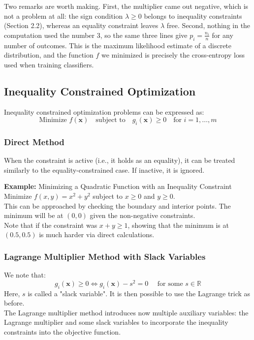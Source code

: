 \documentclass[]{article}
\newcommand{\R}{\mathbb{R}}
\begin{document}
	Two remarks are worth making.
	First, the multiplier came out negative, which is not a problem at all: the sign condition $\lambda \geq 0$ belongs to inequality constraints (Section 2.2), whereas an equality constraint leaves $\lambda$ free.
	Second, nothing in the computation used the number $3$, so the same three lines give $p_i = \frac{n_i}{n}$ for any number of outcomes.
	This is the maximum likelihood estimate of a discrete distribution, and the function $f$ we minimized is precisely the cross-entropy loss used when training classifiers.
	
	\subsection{Inequality Constrained Optimization}
	Inequality constrained optimization problems can be expressed as:
	$$
	\text{Minimize } f(\mathbf{x})
	\quad
	\text{subject to}
	\quad
	g_i(\mathbf{x}) \geq 0
	\quad
	\text{for } i = 1, \dots, m
	$$
	
	\subsubsection{Direct Method}
	When the constraint is active (i.e., it holds as an equality), it can be treated similarly to the equality-constrained case.
	If inactive, it is ignored.
	
	\vspace{1cm}
	\textbf{Example:}
	Minimizing a Quadratic Function with an Inequality Constraint
	\\
	Minimize $f(x, y) = x^2 + y^2$ subject to $x \geq 0$ and $y \geq 0$.
	\\
	This can be approached by checking the boundary and interior points.
	The minimum will be at $(0,0)$ given the non-negative constraints.
	\\
	Note that if the constraint was $x+y \geq 1$, showing that the minimum is at $(0.5, 0.5)$ is much harder via direct calculations.
	
	\subsubsection{Lagrange Multiplier Method with Slack Variables}
	We note that:
	$$
	g_i(\mathbf{x}) \geq 0
	\iff
	g_i(\mathbf{x}) -s^2 = 0
	\quad
	\text{ for some } s \in \R
	$$
	Here, $s$ is called a "slack variable".
	It is then possible to use the Lagrange trick as before.
	\\
	The Lagrange multiplier method introduces now multiple auxiliary variables: the Lagrange multiplier and some slack variables to incorporate the inequality constraints into the objective function.
	
\end{document}
